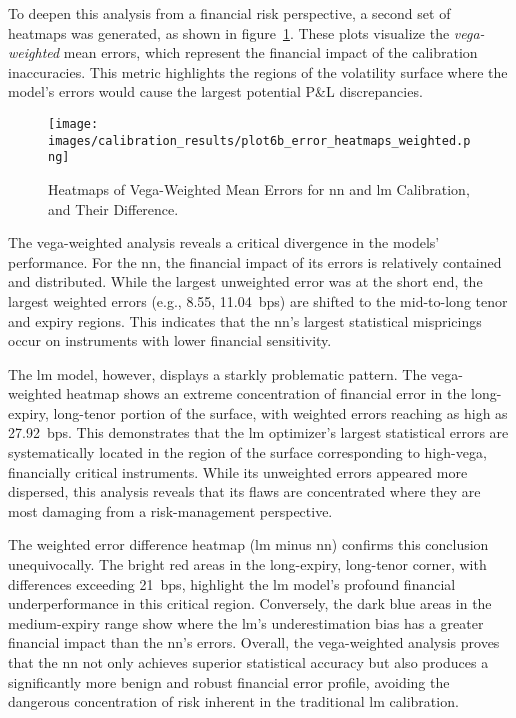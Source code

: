 To deepen this analysis from a financial risk perspective, a second set of heatmaps was generated, as shown in figure~\ref{fig:error_heatmaps_weighted}. These plots visualize the \textit{vega-weighted} mean errors, which represent the financial impact of the calibration inaccuracies. This metric highlights the regions of the volatility surface where the model's errors would cause the largest potential P\&L discrepancies.

\begin{figure}[H]
	\centering
	\texttt{[image: images/calibration\_results/plot6b\_error\_heatmaps\_weighted.png]}
	\caption{Heatmaps of Vega-Weighted Mean Errors for \ac{nn} and \ac{lm} Calibration, and Their Difference.}
	\label{fig:error_heatmaps_weighted}
\end{figure}

The vega-weighted analysis reveals a critical divergence in the models' performance. For the \ac{nn}, the financial impact of its errors is relatively contained and distributed. While the largest unweighted error was at the short end, the largest weighted errors (e.g., 8.55, 11.04~\ac{bps}) are shifted to the mid-to-long tenor and expiry regions. This indicates that the \ac{nn}'s largest statistical mispricings occur on instruments with lower financial sensitivity.

The \ac{lm} model, however, displays a starkly problematic pattern. The vega-weighted heatmap shows an extreme concentration of financial error in the long-expiry, long-tenor portion of the surface, with weighted errors reaching as high as 27.92~\ac{bps}. This demonstrates that the \ac{lm} optimizer's largest statistical errors are systematically located in the region of the surface corresponding to high-vega, financially critical instruments. While its unweighted errors appeared more dispersed, this analysis reveals that its flaws are concentrated where they are most damaging from a risk-management perspective.

The weighted error difference heatmap (\ac{lm} minus \ac{nn}) confirms this conclusion unequivocally. The bright red areas in the long-expiry, long-tenor corner, with differences exceeding 21~\ac{bps}, highlight the \ac{lm} model's profound financial underperformance in this critical region. Conversely, the dark blue areas in the medium-expiry range show where the \ac{lm}'s underestimation bias has a greater financial impact than the \ac{nn}'s errors. Overall, the vega-weighted analysis proves that the \ac{nn} not only achieves superior statistical accuracy but also produces a significantly more benign and robust financial error profile, avoiding the dangerous concentration of risk inherent in the traditional \ac{lm} calibration.

